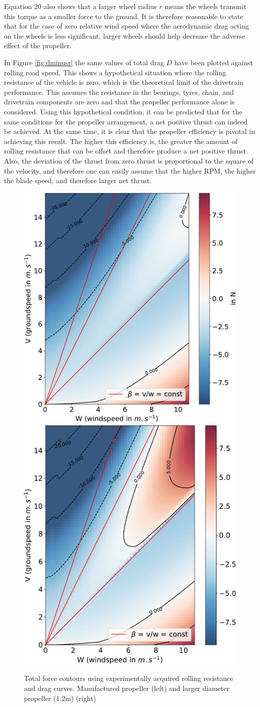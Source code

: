 Equation 20 also shows that a larger wheel radius $r$ means the wheels transmit this torque as a smaller force to the ground. It is therefore reasonable to state that for the case of zero relative wind speed where the aerodynamic drag acting on the wheels is less significant, larger wheels should help decrease the adverse effect of the propeller. 

In Figure \ref{fig:dminusr} the same values of total drag $D$ have been plotted against rolling road speed. This shows a hypothetical situation where the rolling resistance of the vehicle is zero, which is the theoretical limit of the drivetrain performance. This assumes the resistance in the bearings, tyres, chain, and drivetrain components are zero and that the propeller performance alone is considered. Using this hypothetical condition, it can be predicted that for the same conditions for the propeller arrangement, a net positive thrust can indeed be achieved. At the same time, it is clear that the propeller efficiency is pivotal in achieving this result. The higher this efficiency is, the greater the amount of rolling resistance that can be offset and therefore produce a net positive thrust. Also, the deviation of the thrust from zero thrust is proportional to the square of the velocity, and therefore one can easily assume that the higher RPM, the higher the blade speed, and therefore larger net thrust.


\begin{figure}
    \centering
    \includegraphics[width = 0.447\linewidth]{images/part11/expe.pdf}
    \includegraphics[width = 0.43\linewidth]{images/part11/expebigger.pdf}
    \caption{Total force contours using experimentally acquired rolling resistance and drag curves. Manufactured propeller (left) and larger diameter propeller (1.2m) (right)}
    \label{fig:expecontours}
\end{figure}

